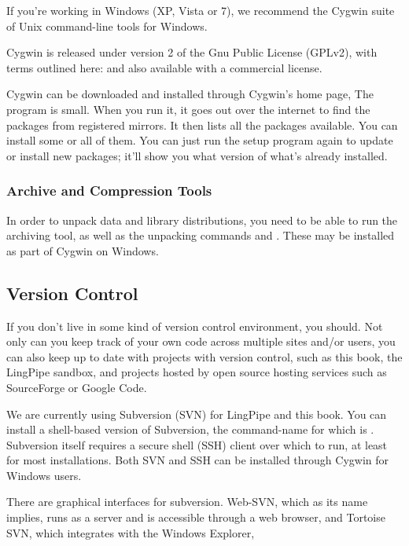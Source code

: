 If you're working in Windows (XP, Vista or 7), we recommend the 
Cygwin suite of Unix command-line tools for Windows.  

Cygwin is released under version 2 of the Gnu Public License (GPLv2), with
terms outlined here:
%
%
and also available with a commercial license.

Cygwin can be downloaded and installed through Cygwin's home page,
%
%
The  program is small.  When you run it, it goes out
over the internet to find the packages from registered mirrors.  It
then lists all the packages available.  You can install some or all of
them.  You can just run the setup program again to update or install
new packages; it'll show you what version of what's already installed.

\subsubsection{Archive and Compression Tools}

In order to unpack data and library distributions, you need to be able
to run the  archiving tool, as well as the unpacking commands
 and .  These may be installed as part of
Cygwin on Windows.


\subsection{Version Control}

If you don't live in some kind of version control environment, you should.
Not only can you keep track of your own code across multiple sites and/or
users, you can also keep up to date with projects with version control,
such as this book, the LingPipe sandbox, and projects hosted by open
source hosting services such as SourceForge or Google Code.

We are currently using Subversion (SVN) for LingPipe and this book.
You can install a shell-based version of Subversion, the command-name
for which is .  Subversion itself requires a secure shell
(SSH) client over which to run, at least for most installations.  Both
SVN and SSH can be installed through Cygwin for Windows users.

There are graphical interfaces for subversion.  
Web-SVN, which as its name implies, runs as a server and is
accessible through a web browser, 
%
%
and Tortoise SVN, which integrates with the Windows Explorer,
%

